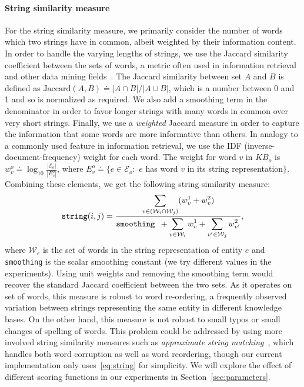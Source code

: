 \documentclass{sig-alternate}
\newcommand{\D}{\displaystyle}
\renewcommand{\tt}[1]{\texttt{#1}}
\newcommand{\KB}{K\!B}
\begin{document}
\paragraph*{String similarity measure} For the string similarity measure, we primarily consider the number of words which two strings have in common, albeit weighted by their information content. In order to handle the varying lengths of strings, we use the Jaccard similarity coefficient between the sets of words, a metric often used in information retrieval and other data mining fields~\cite{hamers89Jaccard,getoor07relational}. The Jaccard similarity between set $A$ and $B$ is defined as $\textrm{Jaccard}(A,B) \doteq |A \cap B| / |A \cup B|$, which is a number between 0 and 1 and so is normalized as required. We also add a smoothing term in the denominator in order to favor longer strings with many words in common over very short strings. Finally, we use a \emph{weighted} Jaccard measure in order to capture the information that some words are more informative than others. In analogy to a commonly used feature in information retrieval, we use the IDF (inverse-document-frequency) weight for each word. The weight for word $v$ in $\KB_o$ is $w^o_v \doteq \log_{10} \frac{|\mathcal{E}_o|}{|E^o_v|}$, where $E^o_v \doteq \{e \in \mathcal{E}_o :$ $e$ has word $v$ in its string representation$\}$. Combining these elements, we get the following string similarity measure:
{\addtolength\abovedisplayskip{-4mm} %
\begin{equation} \label{eq:string}
\textrm{\tt{string}}(i,j) = \frac{\D \sum_{v \in \left(\mathcal{W}_i \cap  \mathcal{W}_j\right)} (w^1_v + w^2_v)}
    {\D \texttt{smoothing } + \sum_{v \in \mathcal{W}_i} w^1_v + \sum_{v' \in \mathcal{W}_j} w^2_{v'}},
\end{equation}
}where $\mathcal{W}_e$ is the set of words in the string representation of entity $e$ and \texttt{smoothing} is the scalar smoothing constant (we try different values in the experiments). Using unit weights and removing the smoothing term would recover the standard Jaccard coefficient between the two sets. As it operates on set of words, this measure is robust to word re-ordering, a frequently observed variation between strings representing the same entity in different knowledge bases. On the other hand, this measure is not robust to small typos or small changes of spelling of words. This problem could be addressed by using more involved string similarity measures such as \emph{approximate string matching}~\cite{chulman97wordMatching,stoilos05stringMetric}, which handles both word corruption as well as word reordering, though our current implementation only uses~\eqref{eq:string} for simplicity. We will explore the effect of different scoring functions in our experiments in Section~\ref{sec:parameters}.
\end{document}

